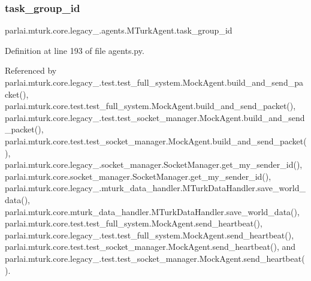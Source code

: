 \subsubsection{\texorpdfstring{task\+\_\+group\+\_\+id}{task\_group\_id}}
{\footnotesize\ttfamily parlai.\+mturk.\+core.\+legacy\+\_.\+agents.\+M\+Turk\+Agent.\+task\+\_\+group\+\_\+id}



Definition at line 193 of file agents.\+py.



Referenced by parlai.\+mturk.\+core.\+legacy\+\_.\+test.\+test\+\_\+full\+\_\+system.\+Mock\+Agent.\+build\+\_\+and\+\_\+send\+\_\+packet(), parlai.\+mturk.\+core.\+test.\+test\+\_\+full\+\_\+system.\+Mock\+Agent.\+build\+\_\+and\+\_\+send\+\_\+packet(), parlai.\+mturk.\+core.\+legacy\+\_.\+test.\+test\+\_\+socket\+\_\+manager.\+Mock\+Agent.\+build\+\_\+and\+\_\+send\+\_\+packet(), parlai.\+mturk.\+core.\+test.\+test\+\_\+socket\+\_\+manager.\+Mock\+Agent.\+build\+\_\+and\+\_\+send\+\_\+packet(), parlai.\+mturk.\+core.\+legacy\+\_.\+socket\+\_\+manager.\+Socket\+Manager.\+get\+\_\+my\+\_\+sender\+\_\+id(), parlai.\+mturk.\+core.\+socket\+\_\+manager.\+Socket\+Manager.\+get\+\_\+my\+\_\+sender\+\_\+id(), parlai.\+mturk.\+core.\+legacy\+\_.\+mturk\+\_\+data\+\_\+handler.\+M\+Turk\+Data\+Handler.\+save\+\_\+world\+\_\+data(), parlai.\+mturk.\+core.\+mturk\+\_\+data\+\_\+handler.\+M\+Turk\+Data\+Handler.\+save\+\_\+world\+\_\+data(), parlai.\+mturk.\+core.\+test.\+test\+\_\+full\+\_\+system.\+Mock\+Agent.\+send\+\_\+heartbeat(), parlai.\+mturk.\+core.\+legacy\+\_.\+test.\+test\+\_\+full\+\_\+system.\+Mock\+Agent.\+send\+\_\+heartbeat(), parlai.\+mturk.\+core.\+test.\+test\+\_\+socket\+\_\+manager.\+Mock\+Agent.\+send\+\_\+heartbeat(), and parlai.\+mturk.\+core.\+legacy\+\_.\+test.\+test\+\_\+socket\+\_\+manager.\+Mock\+Agent.\+send\+\_\+heartbeat().

\mbox{\label{classparlai_1_1mturk_1_1core_1_1legacy__2018_1_1agents_1_1MTurkAgent_a68c34b1ba222914c67440a1c1d26b09a}} 
